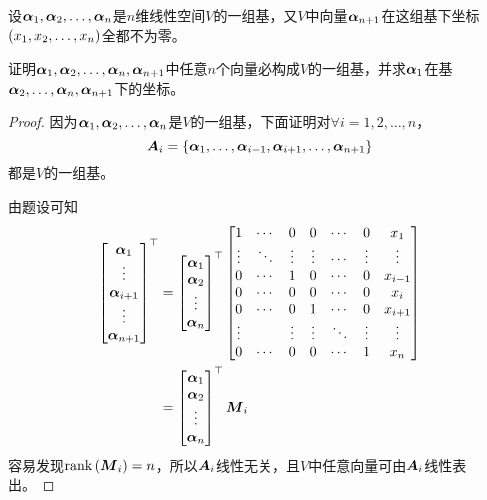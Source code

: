 \begin{problem}
设\({\boldsymbol{\alpha}}_1,{\boldsymbol{\alpha}}_2,\dots,{\boldsymbol{\alpha}}_{n}\)是\(n\)维线性空间\(V\)的一组基，又\(V\)中向量\(\boldsymbol{\alpha}_{n+1}\)在这组基下坐标\(\left( {x}_1,{x}_2,\dots,{x}_{n} \right)\)全都不为零。

证明\({\boldsymbol{\alpha}}_1,{\boldsymbol{\alpha}}_2,\dots,{\boldsymbol{\alpha}}_{n},\boldsymbol{\alpha}_{n+1}\)中任意\(n\)个向量必构成\(V\)的一组基，并求\(\boldsymbol{\alpha}_1\)在基\(\boldsymbol{\alpha}_2,\dots,\boldsymbol{\alpha}_n,\boldsymbol{\alpha}_{n+1}\)下的坐标。
\end{problem}
\begin{proof}
    因为\({\boldsymbol{\alpha}}_1,{\boldsymbol{\alpha}}_2,\dots,{\boldsymbol{\alpha}}_{n}\)是\(V\)的一组基，下面证明对\(\forall i=1,2,\dots,n\)，
    \begin{equation*}
        \boldsymbol{A}_i=\left\{\boldsymbol{\alpha}_1,\dots,\boldsymbol{\alpha}_{i-1},\boldsymbol{\alpha}_{i+1},\dots,\boldsymbol{\alpha}_{n+1} \right\}
    \end{equation*}
    都是\(V\)的一组基。

    由题设可知
    \begin{align*}
        \begin{bmatrix}\boldsymbol{\alpha}_1\\\vdots\\\boldsymbol{\alpha}_{i+1}\\\vdots\\\boldsymbol{\alpha}_{n+1}\end{bmatrix}^\top
         & =
        \begin{bmatrix}\boldsymbol{\alpha}_1\\\boldsymbol{\alpha}_2\\\vdots\\\boldsymbol{\alpha}_n\end{bmatrix}^\top
        \begin{bmatrix}
            1      & \cdots & 0      & 0      & \cdots & 0      & x_1     \\
            \vdots & \ddots & \vdots & \vdots & \cdots & \vdots & \vdots  \\
            0      & \cdots & 1      & 0      & \cdots & 0      & x_{i-1} \\
            0      & \cdots & 0      & 0      & \cdots & 0      & x_i     \\
            0      & \cdots & 0      & 1      & \cdots & 0      & x_{i+1} \\
            \vdots &        & \vdots & \vdots & \ddots & \vdots & \vdots  \\
            0      & \cdots & 0      & 0      & \cdots & 1      & x_n
        \end{bmatrix} \\
         & =
        \begin{bmatrix}\boldsymbol{\alpha}_1\\\boldsymbol{\alpha}_2\\\vdots\\\boldsymbol{\alpha}_n\end{bmatrix}^\top\boldsymbol{M}_i
    \end{align*}
    容易发现\(\mathrm{rank}\left( \boldsymbol{M}_i \right)=n\)，所以\(\boldsymbol{A}_i\)线性无关，且\(V\)中任意向量可由\(\boldsymbol{A}_i\)线性表出。


\end{proof}
